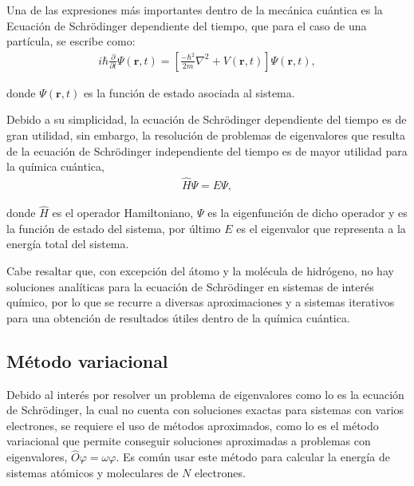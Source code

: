 Una de las expresiones más importantes dentro de la mecánica cuántica es la
Ecuación de Schr\"odinger dependiente del tiempo, que para el caso de una
partícula, se escribe como:
%
\begin{align}
i\hbar \frac{\partial}{\partial t} \Psi (\mathbf{r}, t) = 
\left [ \frac{-\hbar^2}{2m}\nabla^2 + V(\mathbf{r},t) \right ] \Psi (\mathbf{r}, t),
\end{align}
%

\noindent donde $\Psi (\mathbf{r}, t)$
es la función de estado
asociada al sistema.

Debido a su simplicidad, la ecuación de Schr\"odinger dependiente del tiempo es
de gran utilidad, sin embargo, la resolución de problemas de eigenvalores que
resulta de la ecuación de Schr\"odinger independiente del tiempo es de mayor
utilidad para la química cuántica,
%
\begin{align}
\widehat{H}\Psi = E\Psi ,
\end{align}

\noindent donde $\widehat{H}$ es el operador Hamiltoniano, $\Psi$ es la
eigenfunción de dicho operador y es la función de estado del sistema, por
último $E$ es el eigenvalor que representa a la energía total del sistema.

Cabe resaltar que, con excepción del átomo y la molécula de hidrógeno, no hay
soluciones analíticas para la ecuación de Schr\"odinger en sistemas de interés
químico, por lo que se recurre a diversas aproximaciones y a sistemas
iterativos para una obtención de resultados útiles dentro de la química
cuántica.

\subsection{Método variacional}

Debido al interés por resolver un problema de eigenvalores como lo es la
ecuación de Schrödinger, la cual no cuenta con soluciones exactas para sistemas
con varios electrones, se requiere el uso de métodos aproximados, como lo es el
método variacional que permite conseguir soluciones aproximadas a problemas con
eigenvalores, $\widehat{O}\varphi = \omega\varphi$. Es común usar este método
para calcular la energía de sistemas atómicos y moleculares de $N$ electrones.

